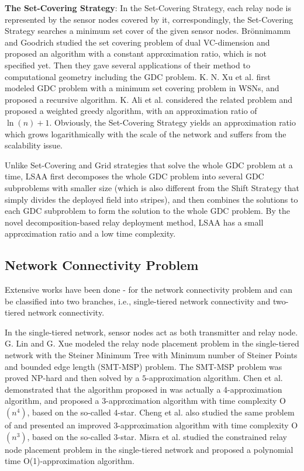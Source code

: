 \documentclass[journal]{IEEEtran}
\begin{document}
\textbf{The Set-Covering Strategy}: In the Set-Covering Strategy, each relay node is represented by the sensor nodes covered by it, correspondingly,
the Set-Covering Strategy searches a minimum set cover of the given sensor nodes. Br\"{o}nnimamm and Goodrich \cite{Bronninamm95} studied the
set covering problem of dual VC-dimension and proposed an algorithm with a constant approximation ratio, which is not specified yet. Then
they gave several applications of their method to computational geometry including the GDC problem. K. N. Xu et al. \cite{Xu05} first modeled
GDC problem with a minimum set covering problem in WSNs, and proposed a recursive algorithm. K. Ali et al. \cite{Ali11} considered the related
problem and proposed a weighted greedy algorithm, with an approximation ratio of $\ln (n)+1$. Obviously, the Set-Covering Strategy yields an approximation ratio which grows logarithmically with the scale of the network and suffers from the scalability issue.

Unlike Set-Covering and Grid strategies that solve the whole GDC problem at a time, LSAA first decomposes the whole GDC problem into several GDC subproblems with smaller size (which is also different from the Shift Strategy that simply divides the deployed field into stripes), and then combines the solutions to each GDC subproblem to form the solution to the whole GDC problem. By the novel decomposition-based relay deployment method, LSAA has a small approximation ratio and a low time complexity.

\subsection{Network Connectivity Problem}
Extensive works have been done \cite{Tang06} \cite{Lin99}-\cite{Dandekar12} for the network connectivity problem and can be classified
into two branches, i.e., single-tiered network connectivity and two-tiered network connectivity.

In the single-tiered network, sensor nodes act as both transmitter and relay node. G. Lin and G. Xue \cite{Lin99} modeled the relay node placement
problem in the single-tiered network with the Steiner Minimum Tree with Minimum number of Steiner Points and bounded edge length (SMT-MSP) problem. The SMT-MSP problem was proved NP-hard and then solved by a $5$-approximation algorithm. Chen et al. \cite{Chen00} demonstrated that the algorithm proposed in \cite{Lin99} was actually a 4-approximation algorithm, and proposed a 3-approximation algorithm with time complexity O$(n^4)$, based on the so-called 4-star. Cheng et al. \cite{Cheng07} also studied the same problem of \cite{Chen00} and presented an improved 3-approximation algorithm with time complexity O$(n^3)$, based on the so-called 3-star. Misra et al. \cite{Misra08} \cite{Misra10} studied the constrained relay node placement problem in the single-tiered network and proposed a polynomial time O(1)-approximation algorithm.
\end{document}
